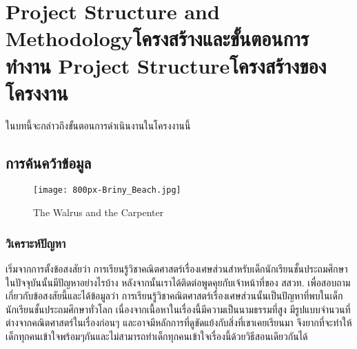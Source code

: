 \chapter{\ifproject%
\ifenglish Project Structure and Methodology\else โครงสร้างและขั้นตอนการทำงาน\fi
\else%
\ifenglish Project Structure\else โครงสร้างของโครงงาน\fi
\fi
}

ในบทนี้จะกล่าวถึงขั้นตอนการดำเนินงานในโครงงานนี้

\makeatletter


\makeatother

\section{การค้นคว้าข้อมูล}

\begin{figure}
\begin{center}
\texttt{[image: 800px-Briny\_Beach.jpg]}
\end{center}
\caption[Poem]{The Walrus and the Carpenter}
\label{fig:walrus}
\end{figure}

\subsection{วิเคราะห์ปัญหา}
 เริ่มจากการตั้งข้อสงสัยว่า การเรียนรู้วิชาคณิตศาสตร์เรื่องเศษส่วนสำหรับเด็กนักเรียนชั้นประถมศึกษาในปัจจุบันนั้นมีปัญหาอย่างไรบ้าง
 หลังจากนั้นเราได้ติดต่อพูดคุยกับเจ้าหน้าที่ของ สสวท. เพื่อสอบถามเกี่ยวกับข้อสงสัยนี้และได้ข้อมูลว่า การเรียนรู้วิชาคณิตศาสตร์เรื่องเศษส่วนนั้นเป็นปัญหาที่พบในเด็กนักเรียนชั้นประถมศึกษาทั่วโลก
 เนื่องจากเนื้อหาในเรื่องนี้มีความเป็นนามธรรมที่สูง มีรูปแบบจำนวนที่ต่างจากคณิตศาสตร์ในเรื่องก่อนๆ และอาจมีหลักการที่ดูขัดแย้งกับสิ่งที่เขาเคยเรียนมา จึงยากที่จะทำให้เด็กทุกคนเข้าใจพร้อมๆกันและไม่สามารถทำเด็กทุกคนเข้าใจเรื่องนี้ด้วยวิธีสอนเดียวกันได้
